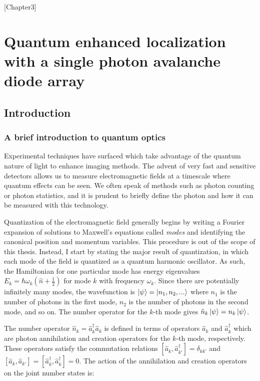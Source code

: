 [Chapter3]
\chapter{Quantum enhanced localization with a single photon avalanche diode array}

\section{Introduction}

\subsection{A brief introduction to quantum optics}

Experimental techniques have surfaced which take advantage of the quantum nature of light to enhance imaging methods. The advent of very fast and sensitive detectors allows us to measure electromagnetic fields at a timescale where quantum effects can be seen. We often speak of methods such as photon counting or photon statistics, and it is prudent to briefly define the photon and how it can be measured with this technology.

Quantization of the electromagnetic field generally begins by writing a Fourier expansion of solutions to Maxwell's equations called \emph{modes} and identifying the canonical position and momentum variables. This procedure is out of the scope of this thesis. Instead, I start by stating the major result of quantization, in which each mode of the field is quantized as a quantum harmonic oscillator. As such, the Hamiltonian for one particular mode has energy eigenvalues $E_{k} = \hbar\omega_{k}(\hat{n} + \frac{1}{2})$ for mode $k$ with frequency $\omega_{k}$. Since there are potentially infinitely many modes, the wavefunction is $\ket{\psi} = \ket{n_{1},n_{2},...}$ where $n_1$ is the number of photons in the first mode, $n_2$ is the number of photons in the second mode, and so on. The number operator for the $k$-th mode gives $\hat{n}_k\ket{\psi} = n_{k}\ket{\psi}$. 

The number operator $\hat{n}_k = \hat{a}_k^\dagger\hat{a}_k$ is defined in terms of operators $\hat{a}_k$ and $\hat{a}_k^\dagger$ which are photon annihilation and creation operators for the $k$-th mode, respectively. These operators satisfy the commutation relations $[\hat{a}_k, \hat{a}_{k'}^\dagger] = \delta_{kk'}$ and $[\hat{a}_k, \hat{a}_{k'}] = [\hat{a}_k^\dagger, \hat{a}_k^\dagger] = 0$. The action of the annihilation and creation operators on the joint number states is:

